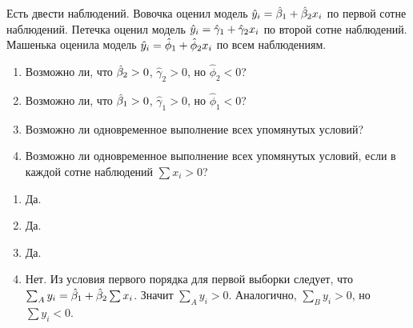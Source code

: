 \begin{problem}
Есть двести наблюдений. Вовочка оценил модель $\hat{y}_i=\hat{\beta}_1+\hat{\beta}_2 x_i$ по первой сотне наблюдений.
Петечка оценил модель $\hat{y}_i=\hat{\gamma}_1+\hat{\gamma}_2 x_i$ по второй сотне наблюдений.
Машенька оценила модель $\hat{y}_i=\hat{\phi}_1+\hat{\phi}_2 x_i$ по всем наблюдениям.
\begin{enumerate}
\item Возможно ли, что $\hat{\beta}_2>0$, $\hat{\gamma}_2>0$, но $\hat{\phi}_2<0$?
\item Возможно ли, что $\hat{\beta}_1>0$, $\hat{\gamma}_1>0$, но $\hat{\phi}_1<0$?
\item Возможно ли одновременное выполнение всех упомянутых условий?
\item Возможно ли одновременное выполнение всех упомянутых условий,
если в каждой сотне наблюдений $\sum x_i > 0$?
\end{enumerate}

\begin{sol}
\begin{enumerate}
\item Да.
\item Да.
\item Да.
\item Нет. Из условия первого порядка для первой выборки следует,
что $\sum_A y_i = \hat{\beta}_1 + \hat{\beta}_2 \sum x_i$. Значит $\sum_A y_i > 0$. Аналогично, $\sum_B y_i >0$,
но $\sum y_i <0$.
\end{enumerate}
\end{sol}
\end{problem}


